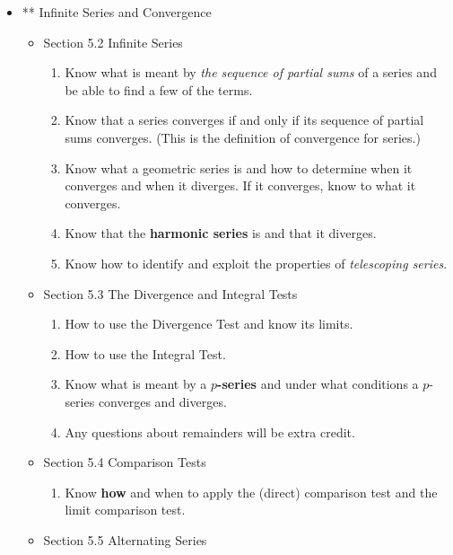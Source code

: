 \documentclass[11pt,fleqn]{article}
\begin{document}
\begin{itemize}
\item ** Infinite Series and Convergence
	\begin{itemize}
	\item Section 5.2 Infinite Series\\
		\begin{enumerate}
		\item Know what is meant by \emph{the sequence of partial sums} of a series and be able to find a few of the terms.
		\item Know that a series converges if and only if its sequence of partial sums converges. (This is the definition of convergence for series.)
		\item Know what a geometric series is and how to determine when it converges and when it diverges. If it converges, know to what it converges. 
		\item Know that the \textbf{harmonic series} is and that it diverges.
		\item Know how to identify and exploit the properties of \emph{telescoping series}.
		\end{enumerate}

	\item Section 5.3 The Divergence and Integral Tests\\

		\begin{enumerate}
		\item How to use the Divergence Test and know its limits.
		\item How to use the Integral Test.
		\item Know what is meant by a \textbf{$p$-series} and under what conditions a $p$-series converges and diverges.
		\item Any questions about remainders will be extra credit.
		\end{enumerate}

	\item Section 5.4 Comparison Tests\\

		\begin{enumerate}
		\item Know \textbf{how} and when to apply the (direct) comparison test and the limit comparison test.\\
		\end{enumerate}

	\item Section 5.5 Alternating Series \\


\end{itemize}
\end{itemize}
\end{document}
